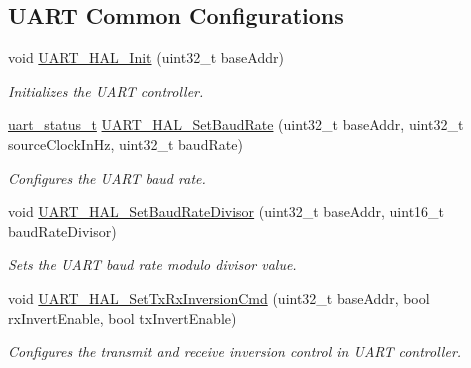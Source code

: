\subsection*{U\+A\+RT Common Configurations}
\begin{DoxyCompactItemize}
\item 
void \hyperlink{group__uart__hal_gab01d47c23b25db598d38ad1595453097}{U\+A\+R\+T\+\_\+\+H\+A\+L\+\_\+\+Init} (uint32\+\_\+t base\+Addr)
\begin{DoxyCompactList}\small\item\em Initializes the U\+A\+RT controller. \end{DoxyCompactList}\item 
\hyperlink{group__uart__hal_ga90effa380d181d660c1bb449977e1535}{uart\+\_\+status\+\_\+t} \hyperlink{group__uart__hal_ga91003c8ec4018b81feef6e3a79a5f6f2}{U\+A\+R\+T\+\_\+\+H\+A\+L\+\_\+\+Set\+Baud\+Rate} (uint32\+\_\+t base\+Addr, uint32\+\_\+t source\+Clock\+In\+Hz, uint32\+\_\+t baud\+Rate)
\begin{DoxyCompactList}\small\item\em Configures the U\+A\+RT baud rate. \end{DoxyCompactList}\item 
void \hyperlink{group__uart__hal_gaabf5e382dfd7627897860dbb97161e68}{U\+A\+R\+T\+\_\+\+H\+A\+L\+\_\+\+Set\+Baud\+Rate\+Divisor} (uint32\+\_\+t base\+Addr, uint16\+\_\+t baud\+Rate\+Divisor)
\begin{DoxyCompactList}\small\item\em Sets the U\+A\+RT baud rate modulo divisor value. \end{DoxyCompactList}\item 
void \hyperlink{group__uart__hal_ga76502a71aec2415638293073d858d254}{U\+A\+R\+T\+\_\+\+H\+A\+L\+\_\+\+Set\+Tx\+Rx\+Inversion\+Cmd} (uint32\+\_\+t base\+Addr, bool rx\+Invert\+Enable, bool tx\+Invert\+Enable)
\begin{DoxyCompactList}\small\item\em Configures the transmit and receive inversion control in U\+A\+RT controller. \end{DoxyCompactList}\end{DoxyCompactItemize}
